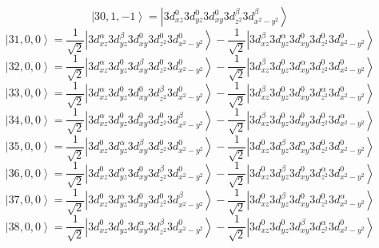 \documentclass[11pt]{article}
\begin{document}
\begin{equation*}
\left|30,1,-1\right>=\left|3d_{xz}^{0}3d_{yz}^{0}3d_{xy}^{0}3d_{z^2}^{\beta}3d_{x^2-y^2}^{\beta}\right>\end{equation*}
\begin{equation*}
\left|31,0,0\right>=\frac{1}{\sqrt{2}}\left|3d_{xz}^{\alpha}3d_{yz}^{\beta}3d_{xy}^{0}3d_{z^2}^{0}3d_{x^2-y^2}^{0}\right>-\frac{1}{\sqrt{2}}\left|3d_{xz}^{\beta}3d_{yz}^{\alpha}3d_{xy}^{0}3d_{z^2}^{0}3d_{x^2-y^2}^{0}\right>\end{equation*}
\begin{equation*}
\left|32,0,0\right>=\frac{1}{\sqrt{2}}\left|3d_{xz}^{\alpha}3d_{yz}^{0}3d_{xy}^{\beta}3d_{z^2}^{0}3d_{x^2-y^2}^{0}\right>-\frac{1}{\sqrt{2}}\left|3d_{xz}^{\beta}3d_{yz}^{0}3d_{xy}^{\alpha}3d_{z^2}^{0}3d_{x^2-y^2}^{0}\right>\end{equation*}
\begin{equation*}
\left|33,0,0\right>=\frac{1}{\sqrt{2}}\left|3d_{xz}^{\alpha}3d_{yz}^{0}3d_{xy}^{0}3d_{z^2}^{\beta}3d_{x^2-y^2}^{0}\right>-\frac{1}{\sqrt{2}}\left|3d_{xz}^{\beta}3d_{yz}^{0}3d_{xy}^{0}3d_{z^2}^{\alpha}3d_{x^2-y^2}^{0}\right>\end{equation*}
\begin{equation*}
\left|34,0,0\right>=\frac{1}{\sqrt{2}}\left|3d_{xz}^{\alpha}3d_{yz}^{0}3d_{xy}^{0}3d_{z^2}^{0}3d_{x^2-y^2}^{\beta}\right>-\frac{1}{\sqrt{2}}\left|3d_{xz}^{\beta}3d_{yz}^{0}3d_{xy}^{0}3d_{z^2}^{0}3d_{x^2-y^2}^{\alpha}\right>\end{equation*}
\begin{equation*}
\left|35,0,0\right>=\frac{1}{\sqrt{2}}\left|3d_{xz}^{0}3d_{yz}^{\alpha}3d_{xy}^{\beta}3d_{z^2}^{0}3d_{x^2-y^2}^{0}\right>-\frac{1}{\sqrt{2}}\left|3d_{xz}^{0}3d_{yz}^{\beta}3d_{xy}^{\alpha}3d_{z^2}^{0}3d_{x^2-y^2}^{0}\right>\end{equation*}
\begin{equation*}
\left|36,0,0\right>=\frac{1}{\sqrt{2}}\left|3d_{xz}^{0}3d_{yz}^{\alpha}3d_{xy}^{0}3d_{z^2}^{\beta}3d_{x^2-y^2}^{0}\right>-\frac{1}{\sqrt{2}}\left|3d_{xz}^{0}3d_{yz}^{\beta}3d_{xy}^{0}3d_{z^2}^{\alpha}3d_{x^2-y^2}^{0}\right>\end{equation*}
\begin{equation*}
\left|37,0,0\right>=\frac{1}{\sqrt{2}}\left|3d_{xz}^{0}3d_{yz}^{\alpha}3d_{xy}^{0}3d_{z^2}^{0}3d_{x^2-y^2}^{\beta}\right>-\frac{1}{\sqrt{2}}\left|3d_{xz}^{0}3d_{yz}^{\beta}3d_{xy}^{0}3d_{z^2}^{0}3d_{x^2-y^2}^{\alpha}\right>\end{equation*}
\begin{equation*}
\left|38,0,0\right>=\frac{1}{\sqrt{2}}\left|3d_{xz}^{0}3d_{yz}^{0}3d_{xy}^{\alpha}3d_{z^2}^{\beta}3d_{x^2-y^2}^{0}\right>-\frac{1}{\sqrt{2}}\left|3d_{xz}^{0}3d_{yz}^{0}3d_{xy}^{\beta}3d_{z^2}^{\alpha}3d_{x^2-y^2}^{0}\right>\end{equation*}
\end{document}
